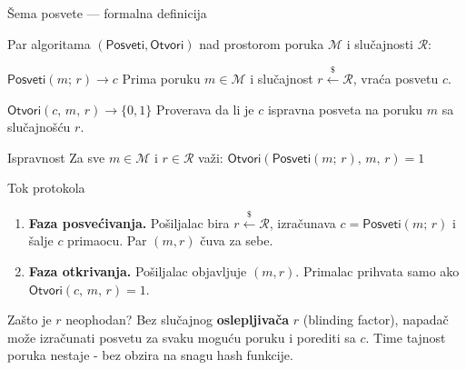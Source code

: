 \documentclass[aspectratio=1610]{beamer}
\newcommand{\keyword}[1]{\textcolor{wcprimary}{\textbf{#1}}}
\begin{document}

\begin{frame}{Šema posvete — formalna definicija}

Par algoritama $(\mathsf{Posveti}, \mathsf{Otvori})$ nad prostorom poruka $\mathcal{M}$ i slučajnosti $\mathcal{R}$:

\begin{block}{$\mathsf{Posveti}(m;\, r) \to c$}
  Prima poruku $m \in \mathcal{M}$ i slučajnost $r \xleftarrow{\$} \mathcal{R}$, vraća posvetu $c$.
\end{block}

\begin{block}{$\mathsf{Otvori}(c,\, m,\, r) \to \{0,1\}$}
  Proverava da li je $c$ ispravna posveta na poruku $m$ sa slučajnošću $r$.
\end{block}

\begin{exampleblock}{Ispravnost}
  Za sve $m \in \mathcal{M}$ i $r \in \mathcal{R}$ važi:
  $\mathsf{Otvori}(\mathsf{Posveti}(m;\, r),\, m,\, r) = 1$
\end{exampleblock}
\end{frame}

\begin{frame}{Tok protokola}

\begin{enumerate}
  
  \item \keyword{Faza posvećivanja.}
    Pošiljalac bira $r \xleftarrow{\$} \mathcal{R}$, izračunava $c = \mathsf{Posveti}(m;\, r)$
    i šalje $c$ primaocu. Par $(m, r)$ čuva za sebe.

  \item \keyword{Faza otkrivanja.}
    Pošiljalac objavljuje $(m, r)$.
    Primalac prihvata samo ako $\mathsf{Otvori}(c,\, m,\, r) = 1$.
\end{enumerate}

\begin{alertblock}{Zašto je $r$ neophodan?}
  Bez slučajnog \keyword{oslepljivača} $r$  (blinding factor), napadač može izračunati posvetu za svaku
  moguću poruku i porediti sa $c$. Time tajnost poruka nestaje - bez obzira na snagu hash funkcije.
\end{alertblock}
\end{frame}

\end{document}
